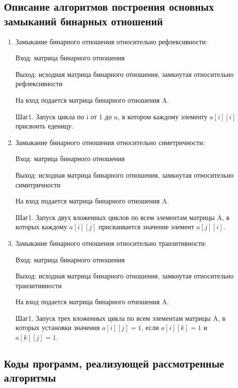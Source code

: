 \documentclass[spec, och, labwork]{shiza}
\begin{document}
        \subsection{Описание алгоритмов построения основных замыканий бинарных отношений}
            \begin{enumerate}
                
                \item Замыкание бинарного отношения относительно рефлексивности:
                
                Вход: матрица бинарного отношения

                Выход: исходная матрица бинарного отношения, замкнутая относительно рефлексивности

                На вход подается матрица бинарного отношения A.

                Шаг1. Запуск цикла по i от 1 до n, в котором каждому элементу $a[i][i]$ присвоить еденицу.

                \item Замыкание бинарного отношения относительно симетричности:
                
                Вход: матрица бинарного отношения

                Выход: исходная матрица бинарного отношения, замкнутая относительно симитричности

                На вход подается матрица бинарного отношения A.

                Шаг1. Запуск двух вложенных циклов по всем элементам матрицы A, в которых каждому $a[i][j]$ присваивается значение элемент
                $a[j][i]$.

                \item Замыкание бинарного отношения относительно транзитивности:
                
                Вход: матрица бинарного отношения

                Выход: исходная матрица бинарного отношения, замкнутая относительно транзитивности

                На вход подается матрица бинарного отношения A.

                Шаг1. Запуск трех вложенных цикла по всем элементам матрицы A, в которых установки значения $a[i][j] = 1$, если
                $a[i][k] = 1$ и $a[k][j] = 1$.
            \end{enumerate}
    
        \subsection{Коды программ, реализующей рассмотренные алгоритмы}
\end{document}
